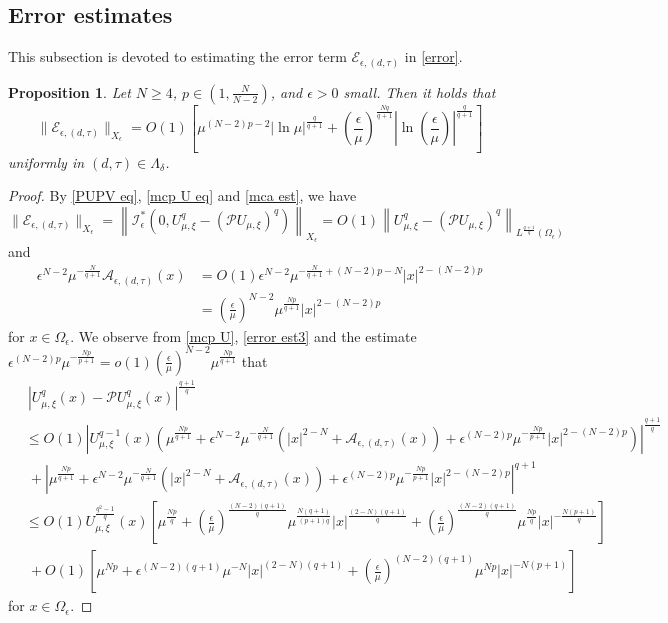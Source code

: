 \documentclass[reqno]{amsart}
\newtheorem{proposition}[theorem]{Proposition}
\theoremstyle{remark}
\newcommand{\ep}{\epsilon}
\newcommand{\mca}{\mathcal{A}}
\newcommand{\mce}{\mathcal{E}}
\newcommand{\mci}{\mathcal{I}}
\newcommand{\mcp}{\mathcal{P}}
\newcommand{\mx}{{\mu,\xi}}
\renewcommand{\(}{\left(}
\renewcommand{\)}{\right)}
\numberwithin{equation}{section}
\begin{document}
\subsection{Error estimates}
This subsection is devoted to estimating the error term $\mce_{\ep,(d,\tau)}$ in \eqref{error}.
\begin{proposition}
Let $N \ge 4$, $p \in (1,\frac{N}{N-2})$, and $\ep > 0$ small. Then it holds that
\begin{equation}\label{error est}
\|\mce_{\ep,(d,\tau)}\|_{X_\ep} = O(1)\left[\mu^{(N-2)p-2}|\ln \mu|^{\frac{q}{q+1}}+ \(\frac{\ep}{\mu}\)^{\frac{Nq}{q+1}} \left|\ln\(\frac{\ep}{\mu}\)\right|^{\frac{q}{q+1}} \right]
\end{equation}
uniformly in $(d,\tau) \in \Lambda_\delta$.
\end{proposition}
\begin{proof}
By \eqref{PUPV eq}, \eqref{mcp U eq} and \eqref{mca est}, we have
\begin{equation}\label{error est2}
\|\mce_{\ep,(d,\tau)}\|_{X_\ep} = \left\|\mci^*_\ep\(0,U_\mx^q-(\mcp U_\mx)^q\)\right\|_{X_\ep} = O(1) \left\|U_\mx^q-(\mcp U_\mx)^q\right\|_{L^{\frac{q+1}{q}}(\Omega_\ep)}
\end{equation}
and
\begin{equation}\label{error est3}
\begin{aligned}
\ep^{N-2}\mu^{-\frac{N}{q+1}} \mca_{\ep,(d,\tau)}(x) &= O(1)\ep^{N-2}\mu^{-\frac{N}{q+1}+(N-2)p-N}|x|^{2-(N-2)p} \\
&= \(\frac{\ep}{\mu}\)^{N-2}\mu^{\frac{Np}{q+1}}{|x|^{2-(N-2)p}}
\end{aligned}
\end{equation}
for $x \in \Omega_\ep$. We observe from \eqref{mcp U}, \eqref{error est3} and the estimate $\ep^{(N-2)p}\mu^{-\frac{Np}{p+1}} %
= o(1) (\frac{\ep}{\mu})^{N-2}\mu^{\frac{Np}{q+1}}$ that
\begin{align*}
&\ \left|U_\mx^q(x)-\mcp U_\mx^q(x)\right|^{\frac{q+1}{q}}\\
&\le O(1) \left|U_\mx^{q-1}(x) \(\mu^{\frac{Np}{q+1}} + \ep^{N-2}\mu^{-\frac{N}{q+1}}\(|x|^{2-N} + \mca_{\ep,(d,\tau)}(x)\) + \ep^{(N-2)p}\mu^{-\frac{Np}{p+1}}|x|^{2-(N-2)p}\)\right|^{\frac{q+1}{q}}\\
&\ + \left|\mu^{\frac{Np}{q+1}} + \ep^{N-2}\mu^{-\frac{N}{q+1}}\(|x|^{2-N} + \mca_{\ep,(d,\tau)}(x)\) + \ep^{(N-2)p}\mu^{-\frac{Np}{p+1}}|x|^{2-(N-2)p}\right|^{q+1}\\
&\le O(1)U_\mx^{\frac{q^2-1}{q}}(x) \left[\mu^{\frac{Np}{q}} + \(\frac{\ep}{\mu}\)^{\frac{(N-2)(q+1)}{q}}\mu^{\frac{N(q+1)}{(p+1)q}} |x|^{\frac{(2-N)(q+1)}{q}}
+ \(\frac{\ep}{\mu}\)^{\frac{(N-2)(q+1)}{q}}\mu^{\frac{Np}{q}} |x|^{-\frac{N(p+1)}{q}}\right]\\
&\ + O(1) \left[\mu^{Np} + \ep^{(N-2)(q+1)}\mu^{-N} |x|^{(2-N)(q+1)} + \(\frac{\ep}{\mu}\)^{(N-2)(q+1)}\mu^{Np} |x|^{-N(p+1)}\right]
\end{align*}
for $x \in \Omega_\ep$.


\end{proof}
\end{document}

